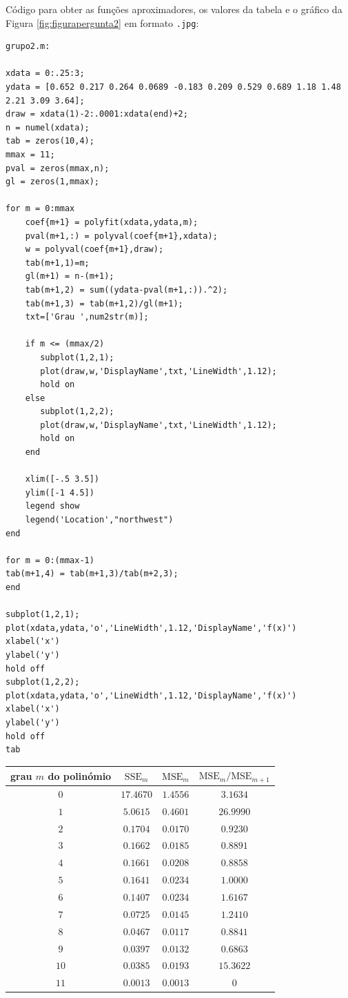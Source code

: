 \documentclass[a4paper,10pt]{extarticle}
\begin{document}
Código para obter as funções aproximadores, os valores da tabela e o gráfico da 
Figura \ref{fig:figurapergunta2} em formato {\tt .jpg}:
{\small
\begin{verbatim}
grupo2.m:

xdata = 0:.25:3;
ydata = [0.652 0.217 0.264 0.0689 -0.183 0.209 0.529 0.689 1.18 1.48 2.21 3.09 3.64];
draw = xdata(1)-2:.0001:xdata(end)+2;
n = numel(xdata);
tab = zeros(10,4);
mmax = 11;
pval = zeros(mmax,n);
gl = zeros(1,mmax);

for m = 0:mmax
    coef{m+1} = polyfit(xdata,ydata,m);
    pval(m+1,:) = polyval(coef{m+1},xdata);
    w = polyval(coef{m+1},draw);
    tab(m+1,1)=m;
    gl(m+1) = n-(m+1);
    tab(m+1,2) = sum((ydata-pval(m+1,:)).^2);
    tab(m+1,3) = tab(m+1,2)/gl(m+1);
    txt=['Grau ',num2str(m)];
    
    if m <= (mmax/2)
       subplot(1,2,1);
       plot(draw,w,'DisplayName',txt,'LineWidth',1.12);
       hold on
    else
       subplot(1,2,2);
       plot(draw,w,'DisplayName',txt,'LineWidth',1.12);
       hold on
    end
    
    xlim([-.5 3.5])
    ylim([-1 4.5])
    legend show
    legend('Location',"northwest")    
end

for m = 0:(mmax-1)
tab(m+1,4) = tab(m+1,3)/tab(m+2,3);
end

subplot(1,2,1);
plot(xdata,ydata,'o','LineWidth',1.12,'DisplayName','f(x)')
xlabel('x')
ylabel('y')
hold off
subplot(1,2,2);
plot(xdata,ydata,'o','LineWidth',1.12,'DisplayName','f(x)')
xlabel('x')
ylabel('y')
hold off
tab

\end{verbatim}
}
\begin{center}
{\small \begin{tabular}{|c|c|c|c|}
\hline
grau $m$ do polinómio &$\mathrm{SSE}_m$&$\mathrm{MSE}_m$&$\mathrm{MSE}_m/\mathrm{MSE}_{m+1}$\\
\hline
$0$&$17.4670$&$1.4556$&$3.1634$\\
\hline
$1$&$5.0615$&$0.4601$&$26.9990$\\
\hline
$2$&$0.1704$&$0.0170$&$0.9230$\\
\hline
$3$&$0.1662$&$0.0185$&$0.8891$\\
\hline
$4$&$0.1661$&$0.0208$&$0.8858$\\
\hline
$5$&$0.1641$&$0.0234$&$1.0000$\\
\hline
$6$&$0.1407$&$0.0234$&$1.6167$\\
\hline
$7$&$0.0725$&$0.0145$&$1.2410$\\
\hline
$8$&$0.0467$&$0.0117$&$0.8841$\\
\hline
$9$&$0.0397$&$0.0132$&$0.6863$\\
\hline
$10$&$0.0385 $&$0.0193$&$15.3622$\\
\hline
$11$&$0.0013$&$0.0013$&$0$\\
\hline
\end{tabular}
}
\end{center}
\end{document}
